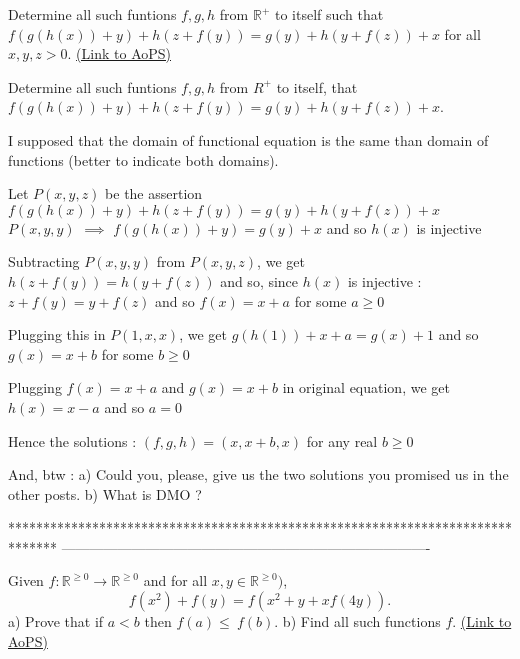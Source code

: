 \begin{problem}
	Determine all such funtions $f,g,h$ from $\mathbb R^+$ to itself such that $f(g(h(x))+y)+h(z+f(y))=g(y)+h(y+f(z))+x$ for all $x,y,z>0$.
	\flushright \href{https://artofproblemsolving.com/community/c6h405320}{(Link to AoPS)}
\end{problem}



\begin{solution}
	\begin{tcolorbox}Determine all such funtions $f,g,h$ from $R^+$ to itself, that $f(g(h(x))+y)+h(z+f(y))=g(y)+h(y+f(z))+x$.\end{tcolorbox}
I supposed that the domain of functional equation is the same than domain of functions (better to indicate both domains).

Let $P(x,y,z)$ be the assertion $f(g(h(x))+y)+h(z+f(y))=g(y)+h(y+f(z))+x$
$P(x,y,y)$ $\implies$ $f(g(h(x))+y)=g(y)+x$ and so $h(x)$ is injective

Subtracting $P(x,y,y)$ from $P(x,y,z)$, we get $h(z+f(y))=h(y+f(z))$ and so, since $h(x)$ is injective :
$z+f(y)=y+f(z)$ and so $f(x)=x+a$ for some $a\ge 0$

Plugging this in $P(1,x,x)$, we get $g(h(1))+x+a=g(x)+1$ and so $g(x)=x+b$ for some $b\ge 0$

Plugging $f(x)=x+a$ and $g(x)=x+b$ in original equation, we get $h(x)=x-a$ and so $a=0$

Hence the solutions : $\boxed{(f,g,h)=(x,x+b,x)}$ for any real $b\ge 0$


And, btw :
a) Could you, please, give us the two solutions you promised us in the other posts.
b) What is DMO ?
\end{solution}
*******************************************************************************
-------------------------------------------------------------------------------

\begin{problem}
	Given $ f:\mathbb{R}^{\geq 0}\to\mathbb{R}^{\geq 0} $ and for all $x,y\in \mathbb{R}^{\geq 0})$,
\[f(x^2)+f(y)=f(x^2+y+xf(4y)).\]
a) Prove that if $a<b$ then $f(a)\leq\ f(b)$.
b) Find all such functions $f$.
	\flushright \href{https://artofproblemsolving.com/community/c6h405554}{(Link to AoPS)}
\end{problem}



